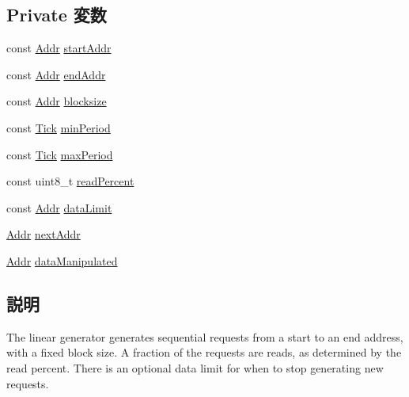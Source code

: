 \subsection*{Private 変数}
\begin{DoxyCompactItemize}
\item 
const \hyperlink{base_2types_8hh_af1bb03d6a4ee096394a6749f0a169232}{Addr} \hyperlink{classLinearGen_a6aeb968ddd05c079215ef147ed22708a}{startAddr}
\item 
const \hyperlink{base_2types_8hh_af1bb03d6a4ee096394a6749f0a169232}{Addr} \hyperlink{classLinearGen_a1f198116a3da3ee4d73abf4760f70815}{endAddr}
\item 
const \hyperlink{base_2types_8hh_af1bb03d6a4ee096394a6749f0a169232}{Addr} \hyperlink{classLinearGen_aebddb11d20f173e7a5ec2c9f2f591171}{blocksize}
\item 
const \hyperlink{base_2types_8hh_a5c8ed81b7d238c9083e1037ba6d61643}{Tick} \hyperlink{classLinearGen_a4e49eae3c2467df5de83a296f8123619}{minPeriod}
\item 
const \hyperlink{base_2types_8hh_a5c8ed81b7d238c9083e1037ba6d61643}{Tick} \hyperlink{classLinearGen_a1c8c13cc371c24fa5cbb14c737c97f9d}{maxPeriod}
\item 
const uint8\_\-t \hyperlink{classLinearGen_af72793641cb115852317a23ca19dc514}{readPercent}
\item 
const \hyperlink{base_2types_8hh_af1bb03d6a4ee096394a6749f0a169232}{Addr} \hyperlink{classLinearGen_ad6ef2f2a9a6167b2d84c3246a2dd2e92}{dataLimit}
\item 
\hyperlink{base_2types_8hh_af1bb03d6a4ee096394a6749f0a169232}{Addr} \hyperlink{classLinearGen_a76968ef2ad8d208fe33cfb493986e85a}{nextAddr}
\item 
\hyperlink{base_2types_8hh_af1bb03d6a4ee096394a6749f0a169232}{Addr} \hyperlink{classLinearGen_a708cc056d3a52d0f8f5a2cceffdc6d99}{dataManipulated}
\end{DoxyCompactItemize}


\subsection{説明}
The linear generator generates sequential requests from a start to an end address, with a fixed block size. A fraction of the requests are reads, as determined by the read percent. There is an optional data limit for when to stop generating new requests. 

